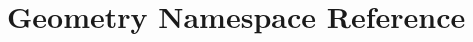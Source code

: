 \hypertarget{namespace_geometry}{
\section{Geometry Namespace Reference}
\label{namespace_geometry}
}
